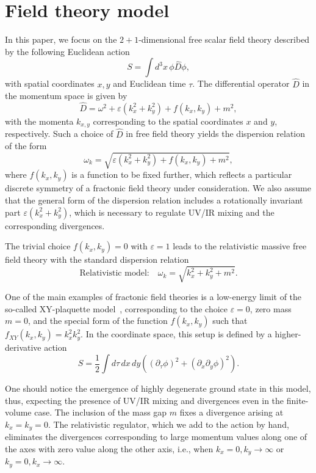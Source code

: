 \documentclass[a4paper,12pt]{article}
\newcommand{\be}{\begin{equation}}
\newcommand{\ee}{\end{equation}}
\newcommand{\eps}{\varepsilon}
\newcommand{\om}{\omega}
\begin{document}
\section{Field theory model}
\label{sec:setup}

In this paper, we focus on the $2 + 1$-dimensional free scalar field theory described by the following Euclidean action
\be 
    S = \int d^3x\,\phi \hat{D} \phi,
\ee 
with spatial coordinates $x,y$ and Euclidean time $\tau$. The differential operator $\hat{D}$ in the momentum space is given by
\be 
    \hat{D} = \om^2 + \eps\left(k_x^2 + k_y^2\right) + f(k_x, k_y) + m^2,
\ee 
with the momenta $k_{x,y}$ corresponding to the spatial coordinates $x$ and $y$, respectively. Such a choice of $\hat{D}$ in free field theory yields the dispersion relation of the form
\be 
    \om_k = \sqrt{\eps\left(k_x^2 + k_y^2\right) + f(k_x, k_y) + m^2},
\ee 
where $f(k_x, k_y)$ is a function to be fixed further, which reflects a particular discrete symmetry of a fractonic field theory under consideration. We also assume that the general form of the dispersion relation includes a rotationally invariant part $\eps(k_x^2 + k_y^2)$, which is necessary to regulate UV/IR mixing and the corresponding divergences.

The trivial choice $f(k_x, k_y)=0$ with $\eps = 1$ leads to the relativistic massive free field theory with the standard dispersion relation
\be 
    \text{Relativistic model:} \quad \om_k = \sqrt{k_x^2 + k_y^2 + m^2}.
    \label{eq:reldisprel}
\ee

One of the main examples of fractonic field theories is a low-energy limit of the so-called XY-plaquette model~\cite{Seiberg:2020bhn}, corresponding to the choice $\eps = 0$, zero mass $m = 0$, and the special form of the function $f(k_x,k_y)$ such that $f_{XY}(k_x,k_y) = k_x^2 k_y^2$. In the coordinate space, this setup is defined by a higher-derivative action
\be
    S = \frac{1}{2}\int d\tau\,dx\,dy \left((\partial_{\tau}\phi)^2 + (\partial_x\partial_y\phi)^2\right).
    \label{eq:Fracton_action}
\ee

One should notice the emergence of highly degenerate ground state in this model, thus, expecting the presence of UV/IR mixing and divergences even in the finite-volume case. The inclusion of the mass gap $m$ fixes a divergence arising at $k_x = k_y = 0$. The relativistic regulator, which we add to the action by hand, eliminates the divergences corresponding to large momentum values along one of the axes with zero value along the other axis, i.e., when $k_x = 0, k_y \to \infty$ or $k_y = 0, k_x \to \infty$. 
\end{document}
